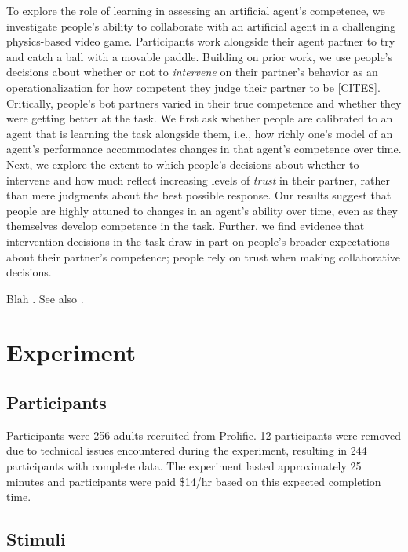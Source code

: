 \documentclass[10pt,letterpaper]{article}
\begin{document}
To explore the role of learning in assessing an artificial agent's competence, we investigate people's ability to collaborate with an artificial agent in a challenging physics-based video game. Participants work alongside their agent partner to try and catch a ball with a movable paddle. Building on prior work, we use people's decisions about whether or not to \textit{intervene} on their partner's behavior as an operationalization for how competent they judge their partner to be [CITES]. Critically, people's bot partners varied in their true competence and whether they were getting better at the task. We first ask whether people are calibrated to an agent that is learning the task alongside them, i.e., how richly one's model of an agent's performance accommodates changes in that agent's competence over time. Next, we explore the extent to which people's decisions about whether to intervene and how much reflect increasing levels of \textit{trust} in their partner, rather than mere judgments about the best possible response. Our results suggest that people are highly attuned to changes in an agent's ability over time, even as they themselves develop competence in the task. Further, we find evidence that intervention decisions in the task draw in part on people's broader expectations about their partner's competence; people rely on trust when making collaborative decisions.


Blah \cite{gweon2021inferential}.
See also .




\section{Experiment}

\subsection{Participants}

Participants were 256 adults recruited from Prolific. 12 participants were removed due to technical issues encountered during the experiment, resulting in 244 participants with complete data. The experiment lasted approximately 25 minutes and participants were paid \$14/hr based on this expected completion time. 


\subsection{Stimuli}
\end{document}

